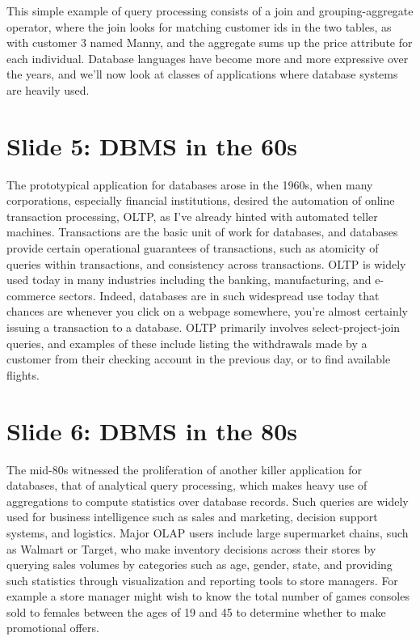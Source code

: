\documentclass{article}
\begin{document}
This simple example of query processing consists of a join and grouping-aggregate
operator, where the join looks for matching customer ids in the two tables, as
with customer 3 named Manny, and the aggregate sums up the price attribute for
each individual. Database languages have become more and more expressive over
the years, and we'll now look at classes of applications where database systems
are heavily used.

\section{Slide 5: DBMS in the 60s}
The prototypical application for databases arose in the 1960s, when
many corporations, especially financial institutions, desired the automation of
online transaction processing, OLTP, as I've already hinted with automated
teller machines. Transactions are the basic unit of work for databases, and
databases provide certain operational guarantees of transactions, such as
atomicity of queries within transactions, and consistency across transactions.
OLTP is widely used today in many industries including the banking,
manufacturing, and e-commerce sectors.  Indeed, databases are in such widespread
use today that chances are whenever you click on a webpage somewhere, you're
almost certainly issuing a transaction to a database. OLTP primarily involves
select-project-join queries, and examples of these include listing the
withdrawals made by a customer from their checking account in the previous day,
or to find available flights.

\section{Slide 6: DBMS in the 80s}
The mid-80s witnessed the proliferation of another killer application
for databases, that of analytical query processing, which makes heavy use of
aggregations to compute statistics over database records. Such queries are
widely used for business intelligence such as sales and marketing, decision
support systems, and logistics. Major OLAP users include large supermarket
chains, such as Walmart or Target, who make inventory decisions across their
stores by querying sales volumes by categories such as age,
gender, state, and providing such statistics through visualization and reporting
tools to store managers. For example a store manager might wish to know the
total number of games consoles sold to females between the ages of 19 and 45 to
determine whether to make promotional offers.
\end{document}
